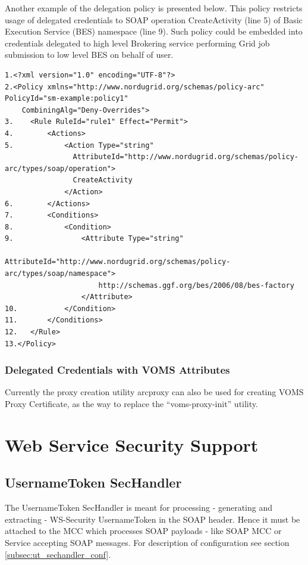 \documentclass{article}                            %
\begin{document}
Another example of the delegation policy is presented below. This policy restricts usage of delegated credentials to SOAP operation CreateActivity (line 5) of Basic Execution Service (BES) \cite{ogsa-bes} namespace (line 9). Such policy could be embedded into credentials delegated to high level Brokering service performing Grid job submission to low level BES on behalf of user.

\begin{verbatim}
1.<?xml version="1.0" encoding="UTF-8"?>
2.<Policy xmlns="http://www.nordugrid.org/schemas/policy-arc" PolicyId="sm-example:policy1"
    CombiningAlg="Deny-Overrides">
3.    <Rule RuleId="rule1" Effect="Permit">
4.        <Actions>
5.            <Action Type="string"
                AttributeId="http://www.nordugrid.org/schemas/policy-arc/types/soap/operation">
                CreateActivity
              </Action>
6.        </Actions>
7.        <Conditions>
8.            <Condition>
9.                <Attribute Type="string"
                      AttributeId="http://www.nordugrid.org/schemas/policy-arc/types/soap/namespace">
                      http://schemas.ggf.org/bes/2006/08/bes-factory
                  </Attribute>
10.           </Condition>
11.       </Conditions>
12.   </Rule>
13.</Policy>
\end{verbatim}

\subsubsection{Delegated Credentials with VOMS Attributes} %
\label{subsec:delegation_voms}
Currently the proxy creation utility arcproxy can also be used for creating VOMS Proxy Certificate, as the way to replace the ``voms-proxy-init'' utility.






\section{Web Service Security Support} %
\label{sec:webservice}

\subsection{UsernameToken SecHandler} %
\label{subsec:username_token}
The UsernameToken SecHandler is meant for processing - generating and extracting - WS-Security \cite{ws-security} UsernameToken in the SOAP header. Hence it must be attached to the MCC which processes SOAP payloads - like SOAP MCC or Service accepting SOAP messages. For description of configuration see section \ref{subsec:ut_sechandler_conf}.
\end{document}
